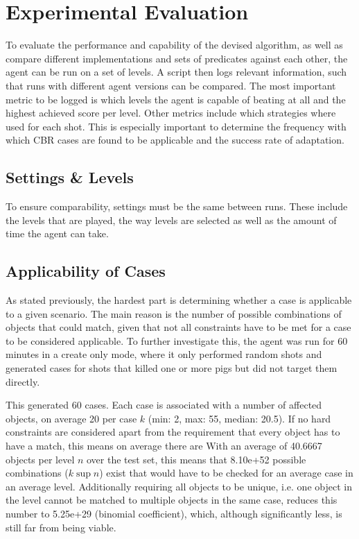 \section{Experimental Evaluation}\label{sec:experimental}
To evaluate the performance and capability of the devised algorithm, as well as compare different implementations and sets of predicates against each other, the agent can be run on a set of levels.
A script then logs relevant information, such that runs with different agent versions can be compared.
The most important metric to be logged is which levels the agent is capable of beating at all and the highest achieved score per level.
Other metrics include which strategies where used for each shot.
This is especially important to determine the frequency with which \acs{CBR} cases are found to be applicable and the success rate of adaptation.



\subsection{Settings \& Levels}\label{subsec:experimental-settings}
To ensure comparability, settings must be the same between runs. These include the levels that are played, the way levels are selected as well as the amount of time the agent can take. %


\subsection{Applicability of Cases}\label{subsec:experimental-applicability}
As stated previously, the hardest part is determining whether a case is applicable to a given scenario.
The main reason is the number of possible combinations of objects that could match, given that not all constraints have to be met for a case to be considered applicable.
To further investigate this, the agent was run for 60 minutes in a create only mode, where it only performed random shots and generated cases for shots that killed one or more pigs but did not target them directly.

This generated 60 cases. Each case is associated with a number of affected objects, on average 20 per case $k$ (min: 2, max: 55, median: 20.5).
If no hard constraints are considered apart from the requirement that every object has to have a match, this means on average there are
With an average of 40.6667 objects per level $n$ over the test set, this means that
8.10e+52 possible combinations ($k\sup{n}$) exist that would have to be checked for an average case in an average level.
Additionally requiring all objects to be unique, i.e. one object in the level cannot be matched to multiple objects in the same case, reduces this number to
5.25e+29 (binomial coefficient), which, although significantly less, is still far from being viable.

